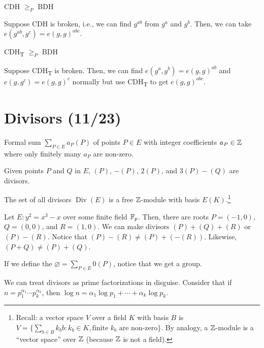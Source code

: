 \documentclass[notes]{agony}
\begin{document}
\begin{prop}
  CDH $\geq_P$ BDH
\end{prop}
\begin{prf}
  Suppose CDH is broken, i.e., we can find $g^{ab}$ from $g^a$ and $g^b$.
  Then, we can take $e(g^{ab},g^c) = e(g,g)^{abc}$.
\end{prf}

\begin{prop}
  CDH\textsubscript{T} $\geq_P$ BDH
\end{prop}
\begin{prf}
  Suppose CDH\textsubscript{T} is broken.
  Then, we can find $e(g^a,g^b) = e(g,g)^{ab}$ and $e(g,g^c) = e(g,g)^c$
  normally but use CDH\textsubscript{T} to get $e(g,g)^{abc}$.
\end{prf}

\section{Divisors (11/23)}

\begin{defn}[divisor]
  Formal sum $\sum\limits_{P \in E} a_P(P)$
  of points $P \in E$ with integer coefficients $a_P \in \mathbb{Z}$
  where only finitely many $a_P$ are non-zero.
\end{defn}
\begin{example}
  Given points $P$ and $Q$ in $E$,
  $(P)$, $-(P)$, $2(P)$, and $3(P)-(Q)$ are divisors.
\end{example}

The set of all divisors $\operatorname{Div}(E)$ is a free $\mathbb{Z}$-module with basis $E(K)$.\footnote{
  Recall: a vector space $V$ over a field $K$ with basis $B$
  is $V = \{\sum_{b \in B} k_b b : k_b \in K, \text{finite $k_b$ are non-zero}\}$.
  By analogy, a $\mathbb{Z}$-module is a ``vector space'' over $\mathbb{Z}$
  (because $\mathbb{Z}$ is not a field).
}

\begin{example}
  Let $E : y^2 = x^3 - x$ over some finite field $\mathbb{F}_p$.
  Then, there are roots $P = (-1,0)$, $Q = (0,0)$, and $R = (1,0)$.
  We can make divisors $(P) + (Q) + (R)$ or $(P) - (R)$.
  Notice that $(P) - (R) \neq (P) + (-(R))$.
  Likewise, $(P + Q) \neq (P) + (Q)$.
\end{example}

If we define the  $\varnothing = \sum\limits_{P \in E} 0(P)$,
notice that we get a group.

We can treat divisors as prime factorizations in disguise.
Consider that if $n = p_1^{\alpha_1}\cdots p_k^{\alpha_k}$,
then $\log n = \alpha_1 \log p_1 + \dotsb + \alpha_k \log p_k$.
\end{document}
